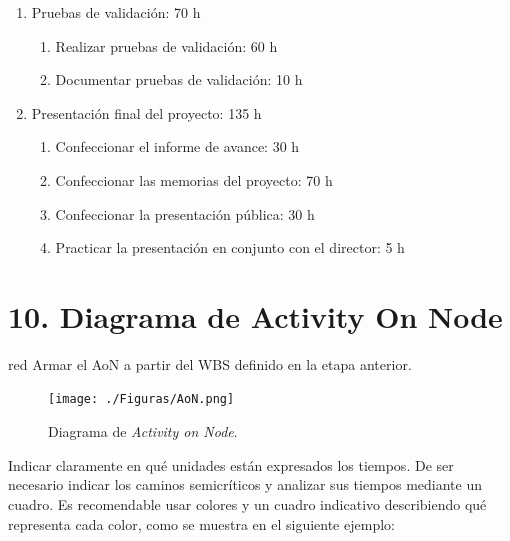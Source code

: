 \documentclass[
11pt, %
]{charter}
\begin{document}
\begin{enumerate}
\begin{enumerate}
    \end{enumerate}
    
\item Pruebas de validación: 70 h
    \begin{enumerate}
    \item Realizar pruebas de validación: 60 h
    \item Documentar pruebas de validación: 10 h
    \end{enumerate}
    
\item Presentación final del proyecto: 135 h
    \begin{enumerate}
    \item Confeccionar el informe de avance: 30 h
    \item Confeccionar las memorias del proyecto: 70 h
    \item Confeccionar la presentación pública: 30 h
    \item Practicar la presentación en conjunto con el director: 5 h
    \end{enumerate}

  
\end{enumerate}


\section{10. Diagrama de Activity On Node}
\label{sec:AoN}

\begin{consigna}{red}
Armar el AoN a partir del WBS definido en la etapa anterior. 



\end{consigna}

\begin{figure}[htpb]
\centering 
\texttt{[image: ./Figuras/AoN.png]}
\caption{Diagrama de \textit{Activity on Node}.}
\label{fig:AoN}
\end{figure}

Indicar claramente en qué unidades están expresados los tiempos.
De ser necesario indicar los caminos semicríticos y analizar sus tiempos mediante un cuadro.
Es recomendable usar colores y un cuadro indicativo describiendo qué representa cada color, como se muestra en el siguiente ejemplo:
\end{document}
